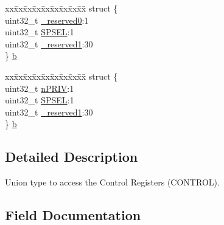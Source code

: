 \begin{DoxyCompactItemize}
\begin{tabbing}
\end{tabbing}\item 
\begin{tabbing}
xx\=xx\=xx\=xx\=xx\=xx\=xx\=xx\=xx\=\kill
struct \{\\
\>uint32\_t \mbox{\hyperlink{union_c_o_n_t_r_o_l___type_ac8a6a13838a897c8d0b8bc991bbaf7c1}{\_reserved0}}:1\\
\>uint32\_t \mbox{\hyperlink{union_c_o_n_t_r_o_l___type_ae185aac93686ffc78e998a9daf41415b}{SPSEL}}:1\\
\>uint32\_t \mbox{\hyperlink{union_c_o_n_t_r_o_l___type_a959a73d8faee56599b7e792a7c5a2d16}{\_reserved1}}:30\\
\} \mbox{\hyperlink{union_c_o_n_t_r_o_l___type_a1aaf2022b762ebb6bdec99768b905056}{b}}\\

\end{tabbing}\item 
\begin{tabbing}
xx\=xx\=xx\=xx\=xx\=xx\=xx\=xx\=xx\=\kill
struct \{\\
\>uint32\_t \mbox{\hyperlink{union_c_o_n_t_r_o_l___type_a2a6e513e8a6bf4e58db169e312172332}{nPRIV}}:1\\
\>uint32\_t \mbox{\hyperlink{union_c_o_n_t_r_o_l___type_ae185aac93686ffc78e998a9daf41415b}{SPSEL}}:1\\
\>uint32\_t \mbox{\hyperlink{union_c_o_n_t_r_o_l___type_a959a73d8faee56599b7e792a7c5a2d16}{\_reserved1}}:30\\
\} \mbox{\hyperlink{union_c_o_n_t_r_o_l___type_ab0197b08e3cf49a0171c6bdfa2178593}{b}}\\

\end{tabbing}\end{DoxyCompactItemize}


\subsection{Detailed Description}
Union type to access the Control Registers (C\+O\+N\+T\+R\+OL). 

\subsection{Field Documentation}
\mbox{\label{union_c_o_n_t_r_o_l___type_ac8a6a13838a897c8d0b8bc991bbaf7c1}} 
